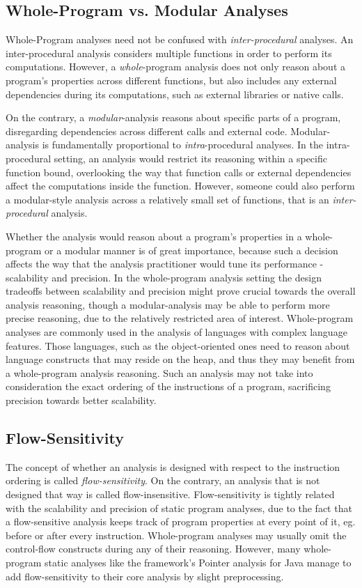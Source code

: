 \subsection{Whole-Program vs. Modular Analyses}

Whole-Program analyses need not be confused with \emph{inter-procedural} analyses.
An inter-procedural analysis considers multiple functions in order to perform
its computations. However, a \emph{whole}-program analysis does not only reason
about a program's properties across different functions, but also includes any
external dependencies during its computations, such as external libraries or
native calls.

On the contrary, a \emph{modular}-analysis reasons about specific parts of a
program, disregarding dependencies across different calls and external code.
Modular-analysis is fundamentally proportional to \emph{intra}-procedural analyses.
In the intra-procedural setting, an analysis would restrict its reasoning within
a specific function bound, overlooking the way that function calls or external
dependencies affect the computations inside the function. However, someone could
also perform a modular-style analysis across a relatively small set of functions,
that is an \emph{inter-procedural} analysis.

Whether the analysis would reason about a program's properties in a whole-program
or a modular manner is of great importance, because such a decision affects the
way that the analysis practitioner would tune its performance - scalability and
precision. In the whole-program analysis setting the design tradeoffs between
scalability and precision might prove crucial towards the overall analysis
reasoning, though a modular-analysis may be able to perform more precise reasoning,
due to the relatively restricted area of interest. Whole-program analyses are
commonly used in the analysis of languages with complex language features. Those
languages, such as the object-oriented ones need to reason about language constructs
that may reside on the heap, and thus they may benefit from a whole-program analysis
reasoning. Such an analysis may not take into consideration the
exact ordering of the instructions of a program, sacrificing precision towards
better scalability.

\subsection{Flow-Sensitivity}

The concept of whether an analysis is designed with respect to
the instruction ordering is called \emph{flow-sensitivity}.
On the contrary, an analysis that is not designed that way is
called flow-insensitive. Flow-sensitivity is tightly related with
the scalability and precision of static program analyses, due to the
fact that a flow-sensitive analysis keeps track of program properties
at every point of it, eg. before or after every instruction.
Whole-program analyses may usually omit the control-flow constructs
during any of their reasoning. However, many whole-program static
analyses like the \doop{} framework's Pointer analysis for Java
manage to add flow-sensitivity to their core analysis by slight
preprocessing\cite{points-to15}.

